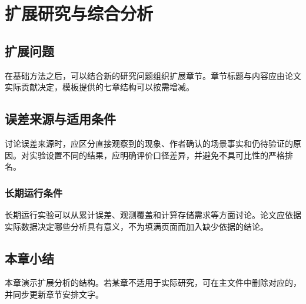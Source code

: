 \chapter{扩展研究与综合分析}\label{chap:extension}
\section{扩展问题}
在基础方法之后，可以结合新的研究问题组织扩展章节。章节标题与内容应由论文实际贡献决定，模板提供的七章结构可以按需增减。

\section{误差来源与适用条件}
讨论误差来源时，应区分直接观察到的现象、作者确认的场景事实和仍待验证的原因。对实验设置不同的结果，应明确评价口径差异，并避免不具可比性的严格排名。

\subsection{长期运行条件}
长期运行实验可以从累计误差、观测覆盖和计算存储需求等方面讨论。论文应依据实际数据决定哪些分析具有意义，不为填满页面而加入缺少依据的结论。

\section{本章小结}
本章演示扩展分析的结构。若某章不适用于实际研究，可在主文件中删除对应的\verb||，并同步更新章节安排文字。
